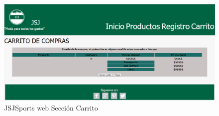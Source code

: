 \begin{figure}[th!]
	\centering
	\includegraphics[width=0.7\linewidth]{conclusiones/imagenes/CarritoPaginaJSJ}
	\caption{JSJSports web Sección Carrito}
\end{figure}